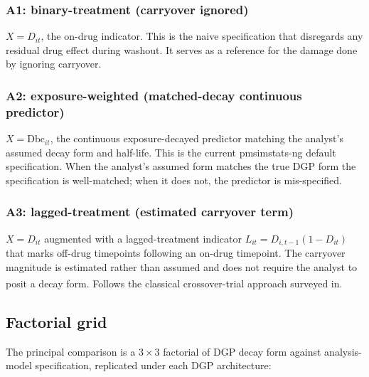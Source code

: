 \documentclass[
]{article}
\begin{document}
\subsubsection{A1: binary-treatment (carryover ignored)}\label{a1-binary-treatment-carryover-ignored}

\(X = D_{it}\), the on-drug indicator. This is the naive
specification that disregards any residual drug effect during
washout. It serves as a reference for the damage done by
ignoring carryover.

\subsubsection{A2: exposure-weighted (matched-decay continuous predictor)}\label{a2-exposure-weighted-matched-decay-continuous-predictor}

\(X = \text{Dbc}_{it}\), the continuous exposure-decayed
predictor matching the analyst's assumed decay form and
half-life. This is the current pmsimstats-ng default
specification. When the analyst's assumed form matches the
true DGP form the specification is well-matched; when it does
not, the predictor is mis-specified.

\subsubsection{A3: lagged-treatment (estimated carryover term)}\label{a3-lagged-treatment-estimated-carryover-term}

\(X = D_{it}\) augmented with a lagged-treatment indicator
\(L_{it} = D_{i,t-1}(1 - D_{it})\) that marks off-drug
timepoints following an on-drug timepoint. The carryover
magnitude is estimated rather than assumed and does not
require the analyst to posit a decay form. Follows the
classical crossover-trial approach surveyed in\textsuperscript{}.

\subsection{Factorial grid}\label{factorial-grid}

The principal comparison is a \(3 \times 3\) factorial of DGP
decay form against analysis-model specification, replicated
under each DGP architecture:
\end{document}
